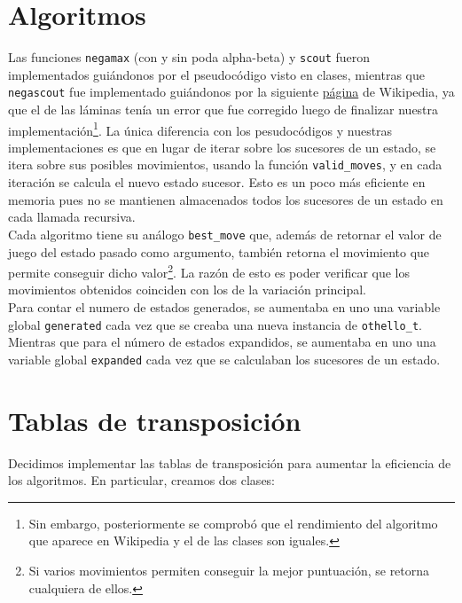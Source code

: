 \documentclass[a4paper,10pt]{article}
\begin{document}
\section*{Algoritmos}
  Las funciones \verb|negamax| (con y sin poda alpha-beta) y \verb|scout| fueron 
  implementados gui\'andonos por el pseudoc\'odigo visto en clases, mientras que 
  \verb|negascout| fue implementado gui\'andonos por la siguiente 
  \href{https://es.wikipedia.org/wiki/Negascout}{p\'agina} de Wikipedia, ya que el 
  de las l\'aminas ten\'ia un error que fue corregido luego de finalizar nuestra 
  implementaci\'on\footnote{Sin embargo, posteriormente se comprob\'o que el rendimiento del
  algoritmo que aparece en Wikipedia y el de las clases son iguales.}. La \'unica 
  diferencia con los pesudoc\'odigos y nuestras implementaciones es que en lugar 
  de iterar sobre los sucesores de un estado, se itera sobre sus posibles movimientos,
  usando la funci\'on \verb|valid_moves|, y en cada iteraci\'on se calcula el nuevo 
  estado sucesor. Esto es un poco m\'as eficiente en memoria pues no se mantienen 
  almacenados todos los sucesores de un estado en cada llamada recursiva.\\
  
  Cada algoritmo tiene su an\'alogo \verb|best_move| que, adem\'as 
  de retornar el valor de juego del estado pasado como argumento, tambi\'en retorna 
  el movimiento que permite conseguir dicho valor\footnote{Si varios movimientos 
  permiten conseguir la mejor puntuaci\'on, se retorna cualquiera de ellos.}. La 
  raz\'on de esto es poder verificar que los movimientos obtenidos coinciden con los 
  de la variaci\'on principal. \\ 

  Para contar el numero de estados generados, se aumentaba en uno una variable 
  global \verb|generated| cada vez que se creaba una nueva instancia de 
  \verb|othello_t|. Mientras que para el n\'umero de estados expandidos, se aumentaba 
  en uno una variable global \verb|expanded| cada vez que se calculaban los sucesores 
  de un estado.

\section*{Tablas de transposici\'on}
  Decidimos implementar las tablas de transposici\'on para aumentar la eficiencia de 
  los algoritmos. En particular, creamos dos clases: 
\end{document}
